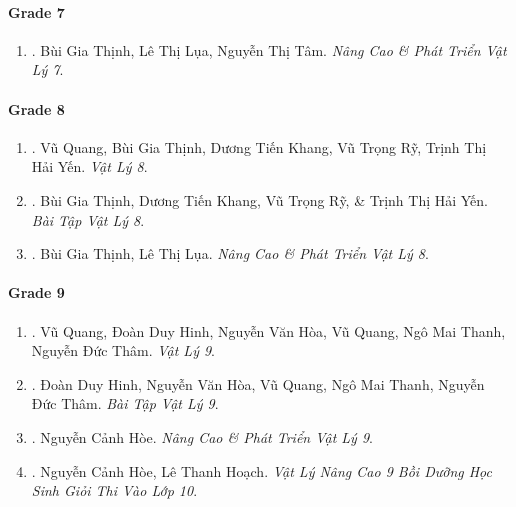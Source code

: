 \documentclass{article}
\begin{document}
\paragraph{Grade 7}

\begin{enumerate}
	\item \cite{Thinh_Lua_ncpt_Vat_Ly_7}. Bùi Gia Thịnh, Lê Thị Lụa, Nguyễn Thị Tâm. {\it Nâng Cao \& Phát Triển Vật Lý 7}.\hfill{\sf[reading]}
\end{enumerate}

\paragraph{Grade 8}

\begin{enumerate}
	\item \cite{SGK_Vat_Ly_8}. Vũ Quang, Bùi Gia Thịnh, Dương Tiến Khang, Vũ Trọng Rỹ, Trịnh Thị Hải Yến. {\it Vật Lý 8}.\hfill{\sf[reading]}
	
	\item \cite{SBT_Vat_Ly_8}. Bùi Gia Thịnh, Dương Tiến Khang, Vũ Trọng Rỹ, \& Trịnh Thị Hải Yến. {\it Bài Tập Vật Lý 8}.\hfill{\sf[reading]}
	
	\item \cite{Thinh_Lua_ncpt_Vat_Ly_8}. Bùi Gia Thịnh, Lê Thị Lụa. {\it Nâng Cao \& Phát Triển Vật Lý 8}.\hfill{\sf[reading]}
\end{enumerate}

\paragraph{Grade 9}

\begin{enumerate}
	\item \cite{SGK_Vat_Ly_9}. Vũ Quang, Đoàn Duy Hinh, Nguyễn Văn Hòa, Vũ Quang, Ngô Mai Thanh, Nguyễn Đức Thâm. {\it Vật Lý 9}.\hfill{\sf[reading]}
	
	\item \cite{SBT_Vat_Ly_9}. Đoàn Duy Hinh, Nguyễn Văn Hòa, Vũ Quang, Ngô Mai Thanh, Nguyễn Đức Thâm. {\it Bài Tập Vật Lý 9}.\hfill{\sf[reading]}
	
	\item \cite{Hoe_Vat_Ly_9}. Nguyễn Cảnh Hòe. {\it Nâng Cao \& Phát Triển Vật Lý 9}.\hfill{\sf[reading]}
	
	\item \cite{Hoe_Hoach_Vat_Ly_nang_cao_9}. Nguyễn Cảnh Hòe, Lê Thanh Hoạch. {\it Vật Lý Nâng Cao 9 Bồi Dưỡng Học Sinh Giỏi Thi Vào Lớp 10}.\hfill{\sf[reading]}
\end{enumerate}
\end{document}
